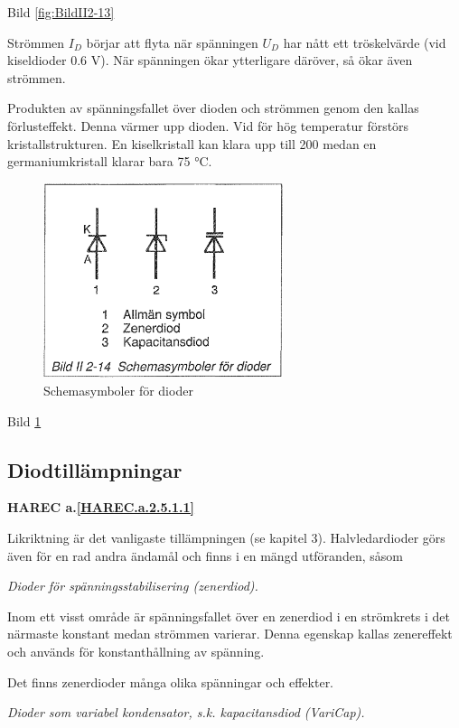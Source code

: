 Bild \ref{fig:BildII2-13}

Strömmen \(I_D\) börjar att flyta när spänningen \(U_D\) har nått ett
tröskelvärde (vid kiseldioder 0.6 V). När spänningen ökar ytterligare däröver,
så ökar även strömmen.

Produkten av spänningsfallet över dioden och strömmen genom den kallas
förlusteffekt. Denna värmer upp dioden. Vid för hög temperatur förstörs
kristallstrukturen. En kiselkristall kan klara upp till 200 medan en
germaniumkristall klarar bara 75 °C.

\begin{figure}[h]
\begin{center}
\includegraphics[width=7cm]{images/bild_2_2-14}
\caption{Schemasymboler för dioder}
\label{fig:BildII2-14}
\end{center}
\end{figure}

Bild \ref{fig:BildII2-14}

\subsection{Diodtillämpningar}
\textbf{HAREC a.\ref{HAREC.a.2.5.1.1}\label{myHAREC.a.2.5.1.1}}

Likriktning är det vanligaste tillämpningen (se kapitel 3). %
Halvledardioder görs även för en rad andra ändamål och finns i en mängd
utföranden, såsom

\emph{Dioder för spänningsstabilisering (zenerdiod).}

  Inom ett visst område är spänningsfallet över en zenerdiod i en strömkrets
  i det närmaste konstant medan strömmen varierar. Denna egenskap kallas
  zenereffekt och används för konstanthållning av spänning.

  Det finns zenerdioder många olika spänningar och effekter.

\emph{Dioder som variabel kondensator, s.k. kapacitansdiod (VariCap).}

